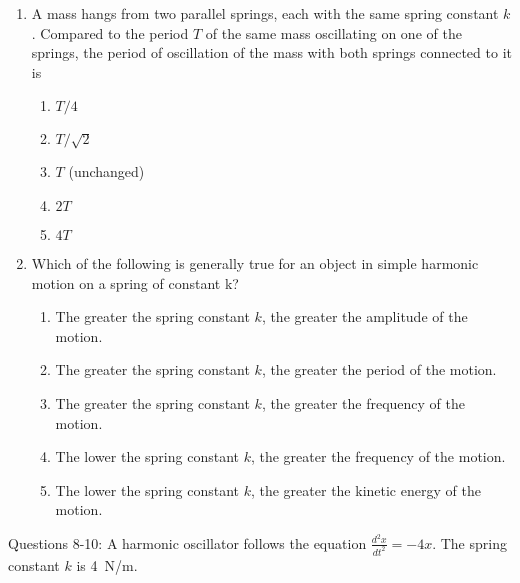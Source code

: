 \documentclass[12pt]{article}
\begin{document}
\begin{enumerate}[leftmargin=50pt,label=\underline{\hspace{0.4in}} \arabic*.]
\item\vspace{-.2in}
  A mass hangs from two parallel springs, each with the same spring
  constant $k$. Compared to the period $T$ of the same mass oscillating on
  one of the springs, the period of oscillation of the mass with both
  springs connected to it is
  \begin{enumerate}[noitemsep,topsep=0pt]
  \item $T/4$
  \item $T/\sqrt{2}$
  \item $T$ (unchanged)
  \item $2T$
  \item $4T$
  \end{enumerate}

\item Which of the following is generally true for an object in simple
  harmonic motion on a spring of constant k?
  \begin{enumerate}[noitemsep,topsep=0pt]
  \item The greater the spring constant $k$, the greater the amplitude of the
    motion.
  \item The greater the spring constant $k$, the greater the period of the
    motion.
  \item The greater the spring constant $k$, the greater the frequency of the
    motion.
  \item The lower the spring constant $k$, the greater the frequency of the
    motion.
  \item The lower the spring constant $k$, the greater the kinetic energy of
    the motion.
  \end{enumerate}
\end{enumerate}

\noindent Questions 8-10: A harmonic oscillator follows the equation
$\displaystyle\frac{d^2x}{dt^2}=-4x$. The spring constant $k$ is \SI{4}{N/m}.
\end{document}
